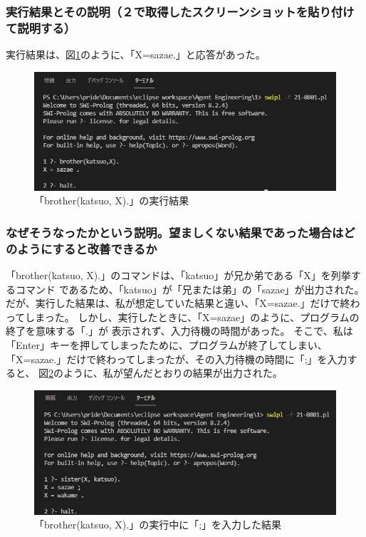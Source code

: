 \subsubsection{実行結果とその説明（２で取得したスクリーンショットを貼り付けて説明する）}
実行結果は、図\ref{graph:2}のように、「X=sazae.」と応答があった。
\begin{figure}[hbtp]
  \centering
  \caption{「brother(katsuo, X).」の実行結果}
  \label{graph:2}
  \includegraphics[scale = 0.7]{21-0801-02.png}
\end{figure}

\subsubsection{なぜそうなったかという説明。望ましくない結果であった場合はどのようにすると改善できるか}
「brother(katsuo, X).」のコマンドは、「katsuo」が兄か弟である「X」を列挙するコマンド
であるため、「katsuo」が「兄または弟」の「sazae」が出力された。
だが、実行した結果は、私が想定していた結果と違い、「X=sazae.」だけで終わってしまった。
しかし、実行したときに、「X=sazae」のように、プログラムの終了を意味する「.」が
表示されず、入力待機の時間があった。
そこで、私は「Enter」キーを押してしまったために、プログラムが終了してしまい、
「X=sazae.」だけで終わってしまったが、その入力待機の時間に「;」を入力すると、
図\ref{graph:2s}のように、私が望んだとおりの結果が出力された。
\begin{figure}[hbtp]
  \centering
  \caption{「brother(katsuo, X).」の実行中に「;」を入力した結果}
  \label{graph:2s}
  \includegraphics[scale = 0.7]{21-0801-02s.png}
\end{figure}
\clearpage


